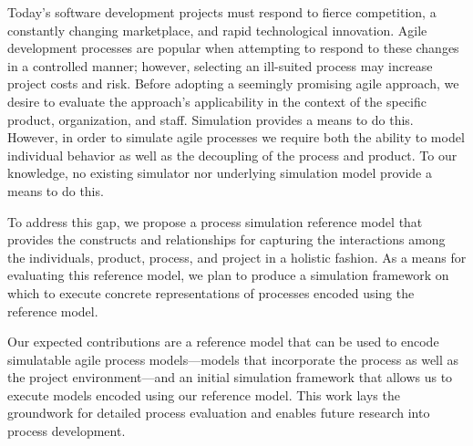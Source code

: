 Today's software development projects must respond to fierce competition, a
constantly  changing marketplace, and rapid technological innovation. Agile
development processes are popular when attempting to respond to these changes in
a controlled manner; however, selecting an ill-suited process may increase
project costs and risk.  Before adopting a seemingly promising agile approach,
we desire to evaluate the approach's applicability in the context of the
specific product, organization, and staff.  Simulation provides a means to do
this.  However, in order to simulate agile processes we require both the ability
to model individual behavior as well as the decoupling of the process and
product.  To our knowledge, no existing simulator nor underlying simulation
model provide a means to do this.

To address this gap, we propose a process simulation reference model
that provides the constructs and relationships for capturing the interactions among
the individuals, product, process, and project in a holistic fashion.  As a
means for evaluating this reference model, we plan to produce a simulation
framework on which to execute concrete representations of processes encoded 
using the reference model.

Our expected contributions are a reference model that can be used to encode
simulatable agile process models---models that incorporate the process as well
as the project environment---and an initial simulation framework that allows us
to execute models encoded using our reference model.  This work lays the
groundwork for detailed \apriori process evaluation and enables future research
into process development.
